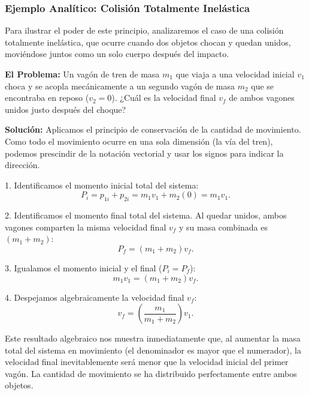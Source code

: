 \documentclass[11pt,a4paper]{book}
\begin{document}
\subsubsection{Ejemplo Analítico: Colisión Totalmente Inelástica}

Para ilustrar el poder de este principio, analizaremos el caso de una colisión totalmente inelástica, que ocurre cuando dos objetos chocan y quedan unidos, moviéndose juntos como un solo cuerpo después del impacto.

\textbf{El Problema:} Un vagón de tren de masa $m_1$ que viaja a una velocidad inicial $v_1$ choca y se acopla mecánicamente a un segundo vagón de masa $m_2$ que se encontraba en reposo ($v_2 = 0$). ¿Cuál es la velocidad final $v_f$ de ambos vagones unidos justo después del choque?

\textbf{Solución:}
Aplicamos el principio de conservación de la cantidad de movimiento. Como todo el movimiento ocurre en una sola dimensión (la vía del tren), podemos prescindir de la notación vectorial y usar los signos para indicar la dirección.

1. Identificamos el momento inicial total del sistema:
\begin{equation}
    P_i = p_{1i} + p_{2i} = m_1 v_1 + m_2 (0) = m_1 v_1.
\end{equation}

2. Identificamos el momento final total del sistema. Al quedar unidos, ambos vagones comparten la misma velocidad final $v_f$ y su masa combinada es $(m_1 + m_2)$:
\begin{equation}
    P_f = (m_1 + m_2) v_f.
\end{equation}

3. Igualamos el momento inicial y el final ($P_i = P_f$):
\begin{equation}
    m_1 v_1 = (m_1 + m_2) v_f.
\end{equation}

4. Despejamos algebraicamente la velocidad final $v_f$:
\begin{equation}
    v_f = \left( \frac{m_1}{m_1 + m_2} \right) v_1.
\end{equation}

Este resultado algebraico nos muestra inmediatamente que, al aumentar la masa total del sistema en movimiento (el denominador es mayor que el numerador), la velocidad final inevitablemente será menor que la velocidad inicial del primer vagón. La cantidad de movimiento se ha distribuido perfectamente entre ambos objetos.
\end{document}
